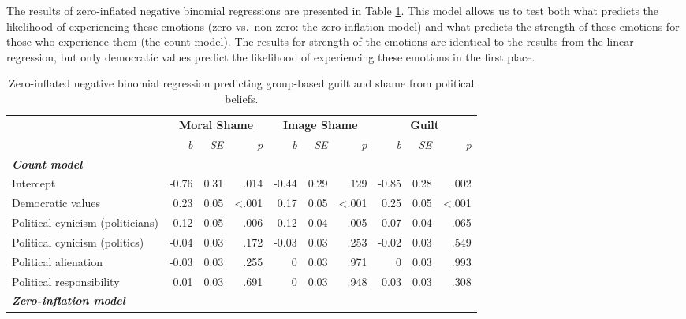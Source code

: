 \documentclass[
]{article}
\begin{document}
The results of zero-inflated negative binomial regressions are presented in Table \ref{tab:TableS2}. This model allows us to test both what predicts the likelihood of experiencing these emotions (zero vs.~non-zero: the zero-inflation model) and what predicts the strength of these emotions for those who experience them (the count model). The results for strength of the emotions are identical to the results from the linear regression, but only democratic values predict the likelihood of experiencing these emotions in the first place.

\begin{table}[H]

\caption{\label{tab:TableS2}Zero-inflated negative binomial regression predicting group-based guilt and shame from political beliefs.}
\centering
\fontsize{8}{10}\selectfont
\begin{tabular}[t]{lrrrrrrrrr}
\toprule
\multicolumn{1}{c}{\textbf{}} & \multicolumn{3}{c}{\textbf{Moral Shame}} & \multicolumn{3}{c}{\textbf{Image Shame}} & \multicolumn{3}{c}{\textbf{Guilt}} \\
\cmidrule(l{3pt}r{3pt}){2-4} \cmidrule(l{3pt}r{3pt}){5-7} \cmidrule(l{3pt}r{3pt}){8-10}
\em{ } & \em{b} & \em{SE} & \em{p} & \em{b} & \em{SE} & \em{p} & \em{b} & \em{SE} & \em{p}\\
\midrule
\em{\textbf{Count model}} & \em{\textbf{}} & \em{\textbf{}} & \em{\textbf{}} & \em{\textbf{}} & \em{\textbf{}} & \em{\textbf{}} & \em{\textbf{}} & \em{\textbf{}} & \em{\textbf{}}\\
\midrule
Intercept & -0.76 & 0.31 & .014 & -0.44 & 0.29 & .129 & -0.85 & 0.28 & .002\\
Democratic values & 0.23 & 0.05 & <.001 & 0.17 & 0.05 & <.001 & 0.25 & 0.05 & <.001\\
Political cynicism (politicians) & 0.12 & 0.05 & .006 & 0.12 & 0.04 & .005 & 0.07 & 0.04 & .065\\
Political cynicism (politics) & -0.04 & 0.03 & .172 & -0.03 & 0.03 & .253 & -0.02 & 0.03 & .549\\
\addlinespace
Political alienation & -0.03 & 0.03 & .255 & 0 & 0.03 & .971 & 0 & 0.03 & .993\\
Political responsibility & 0.01 & 0.03 & .691 & 0 & 0.03 & .948 & 0.03 & 0.03 & .308\\
\midrule
\em{\textbf{Zero-inflation model}} & \em{\textbf{}} & \em{\textbf{}} & \em{\textbf{}} & \em{\textbf{}} & \em{\textbf{}} & \em{\textbf{}} & \em{\textbf{}} & \em{\textbf{}} & \em{\textbf{}}\\

\end{tabular}
\end{table}
\end{document}
